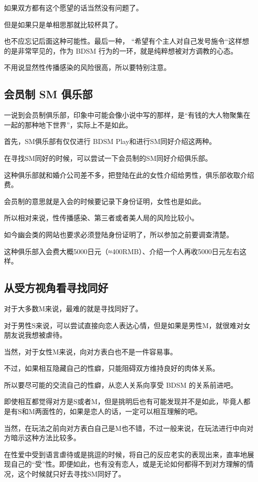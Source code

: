 \documentclass[12pt,UTF8]{ctexbook}
\begin{document}
如果双方都有这个愿望的话当然没有问题了。

但是如果只是单相思那就比较杯具了。

也不应忘记后面这种可能性。最后一种， “希望有个主人对自己发号施令“这样想的是非常罕见的，作为 BDSM 行为的一环，就是纯粹想被对方调教的心态。

不用说显然性传播感染的风险很高，所以要特别注意。

\subsection{会员制 SM 俱乐部}

一说到会员制俱乐部，印象中可能会像小说中写的那样，是“有钱的大人物聚集在一起的那种地下世界”，实际上不是如此。

首先，SM俱乐部有仅仅进行 BDSM Play和进行SM同好介绍这两种。

在寻找SM同好的时候，可以尝试一下会员制的SM同好介绍俱乐部。

这种俱乐部就和婚介公司差不多，把登陆在此的女性介绍给男性，俱乐部收取介绍费。

会员制的意思就是入会的时候要记录下身份证明，女性也是如此。

所以相对来说，性传播感染、第三者或者美人局的风险比较小。

如今幽会类的网站也要求必须登陆身份证明了，所以参加之前要调查清楚。

这种俱乐部入会费大概5000日元（≈400RMB）、介绍一个人再收5000日元左右这样。

\subsection{从受方视角看寻找同好}

对于大多数M来说，最难的就是寻找同好了。

对于男性S来说，可以尝试直接向恋人表达心情，但是如果是男性M，就很难对女朋友说我想被虐待。

当然，对于女性M来说，向对方表白也不是一件容易事。

不过，如果相互隐藏自己的性癖，只能阻碍双方维持良好的肉体关系。

所以要尽可能的交流自己的性癖，从恋人关系向享受 BDSM 的关系前进吧。

即使相互都觉得对方是S或者M，但是挑明后也有可能发现并不是如此，毕竟人都是有S和M两面性的，如果是恋人的话，一定可以相互理解的吧。

当然，在玩法之前向对方表白自己是M也不错，不过一般来说，在玩法进行中向对方暗示这种方法比较多。

在性爱中受到语言虐待或是挑逗的时候，将自己的反应老实的表现出来，直率地展现自己的“受”性。即便如此，也有没有恋人，或是无论如何都得不到对方理解的情况，这个时候就只好去寻找SM同好了。
\end{document}

